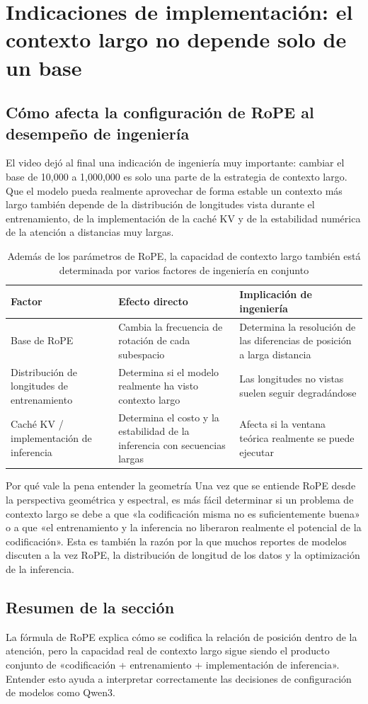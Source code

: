 \section{Indicaciones de implementación: el contexto largo no depende solo de un base}
\subsection{Cómo afecta la configuración de RoPE al desempeño de ingeniería}
El video dejó al final una indicación de ingeniería muy importante: cambiar el base de 10,000 a 1,000,000 es solo una parte de la estrategia de contexto largo. Que el modelo pueda realmente aprovechar de forma estable un contexto más largo también depende de la distribución de longitudes vista durante el entrenamiento, de la implementación de la caché KV y de la estabilidad numérica de la atención a distancias muy largas.

\begin{table}[H]
\centering
\begin{tabular}{p{3.2cm}p{4.6cm}p{4.6cm}}
\toprule
Factor & Efecto directo & Implicación de ingeniería \\
\midrule
Base de RoPE & Cambia la frecuencia de rotación de cada subespacio & Determina la resolución de las diferencias de posición a larga distancia \\
Distribución de longitudes de entrenamiento & Determina si el modelo realmente ha visto contexto largo & Las longitudes no vistas suelen seguir degradándose \\
Caché KV / implementación de inferencia & Determina el costo y la estabilidad de la inferencia con secuencias largas & Afecta si la ventana teórica realmente se puede ejecutar \\
\bottomrule
\end{tabular}
\caption{Además de los parámetros de RoPE, la capacidad de contexto largo también está determinada por varios factores de ingeniería en conjunto}
\end{table}

\begin{knowledgebox}{Por qué vale la pena entender la geometría}
Una vez que se entiende RoPE desde la perspectiva geométrica y espectral, es más fácil determinar si un problema de contexto largo se debe a que «la codificación misma no es suficientemente buena» o a que «el entrenamiento y la inferencia no liberaron realmente el potencial de la codificación». Esta es también la razón por la que muchos reportes de modelos discuten a la vez RoPE, la distribución de longitud de los datos y la optimización de la inferencia.
\end{knowledgebox}

\subsection{Resumen de la sección}
La fórmula de RoPE explica cómo se codifica la relación de posición dentro de la atención, pero la capacidad real de contexto largo sigue siendo el producto conjunto de «codificación + entrenamiento + implementación de inferencia». Entender esto ayuda a interpretar correctamente las decisiones de configuración de modelos como Qwen3.
